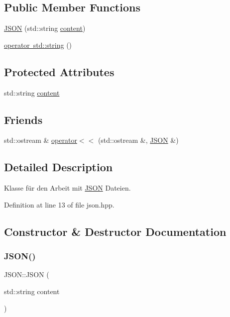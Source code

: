 \subsection*{Public Member Functions}
\begin{DoxyCompactItemize}
\item 
\mbox{\hyperlink{class_j_s_o_n_ae9b8a305b1bdc0aa66d096b226e1d7bb}{J\+S\+ON}} (std\+::string \mbox{\hyperlink{class_j_s_o_n_ad1ace77234b963a2994178ce7f76a181}{content}})
\item 
\mbox{\hyperlink{class_j_s_o_n_a36da157b300564d8007130b3f62e7c07}{operator std\+::string}} ()
\end{DoxyCompactItemize}
\subsection*{Protected Attributes}
\begin{DoxyCompactItemize}
\item 
std\+::string \mbox{\hyperlink{class_j_s_o_n_ad1ace77234b963a2994178ce7f76a181}{content}}
\end{DoxyCompactItemize}
\subsection*{Friends}
\begin{DoxyCompactItemize}
\item 
std\+::ostream \& \mbox{\hyperlink{class_j_s_o_n_aeeae42e34eea710cbc1f0a3176fcd662}{operator$<$$<$}} (std\+::ostream \&, \mbox{\hyperlink{class_j_s_o_n}{J\+S\+ON}} \&)
\end{DoxyCompactItemize}


\subsection{Detailed Description}
Klasse für den Arbeit mit \mbox{\hyperlink{class_j_s_o_n}{J\+S\+ON}} Dateien. 

Definition at line 13 of file json.\+hpp.



\subsection{Constructor \& Destructor Documentation}
\mbox{\label{class_j_s_o_n_ae9b8a305b1bdc0aa66d096b226e1d7bb}} 
\subsubsection{\texorpdfstring{J\+S\+O\+N()}{JSON()}}
{\footnotesize\ttfamily J\+S\+O\+N\+::\+J\+S\+ON (\begin{DoxyParamCaption}\item[{std\+::string}]{content }\end{DoxyParamCaption})\hspace{0.3cm}{\ttfamily [inline]}}

